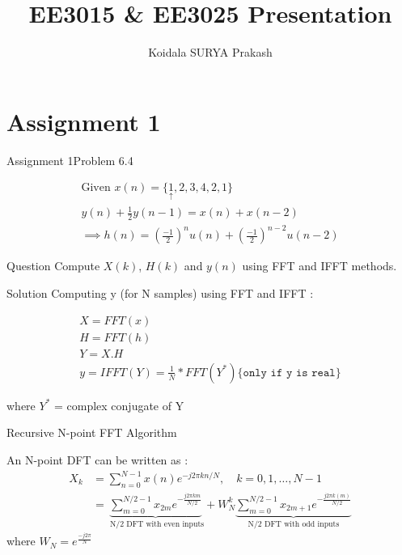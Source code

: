 \documentclass[notheorems]{beamer}
\title{EE3015 \& EE3025 Presentation}
\author{Koidala SURYA Prakash}
\begin{document}
\maketitle

\section{Assignment 1}

\begin{frame}{Assignment 1}{Problem 6.4}


\begin{gather}
     \text{Given   } x(n) = \{ \underset{\uparrow}{1},2,3,4,2,1 \}
         \label{eq:equation0}\\
        y(n) + \frac{1}{2}y(n-1) = x(n) + x(n-2)	
        \label{eq:equation1} \\ 
        \implies   h(n)=\left({\frac{-1}{2}}\right)^nu(n) + \left({\frac{-1}{2}}\right)^{n-2}u(n-2)
        \label{eq:equation2} 
\end{gather}

\begin{block}{Question}
Compute $X(k)$, $H(k)$ and $y(n)$ using FFT and IFFT methods.
\end{block}

\end{frame}


\begin{frame}{Solution}
 Computing y (for N samples) using FFT and IFFT : 
 
\begin{gather}
X = FFT(x)
\label{eq:equation3}\\
H = FFT(h)
\label{eq:equation4}\\
Y = X.H
\label{eq:equation5}\\
y = IFFT(Y) = \frac{1}{N} * FFT(Y^{*})  \{ \texttt{only if y is real} \}
\end{gather}

where $Y^{*}$ = complex conjugate of Y 
\end{frame}

\begin{frame}{Recursive N-point FFT Algorithm   }

    An N-point DFT can be written as : 
\begin{align*}
 X_{k} &=  \sum_{n=0}^{N-1} x(n)e^{-j2\pi kn/N}, \quad k=0,1, \ldots, N-1 \\
       &=  \underbrace{\sum_{m=0}^{N/2 -1} x_{2m}e^{-\frac{j2\pi km}{N/2}}}_\text{ N/2 DFT with even inputs} + W_{N}^k \underbrace{\sum_{m=0}^{N/2 -1} x_{2m+1}e^{-\frac{j2\pi k(m)}{N/2}}}_\text{N/2 DFT with odd inputs}
\end{align*}
where $W_{N} = e^{\frac{-j 2\pi }{N}}$ 


\end{frame}
\end{document}
